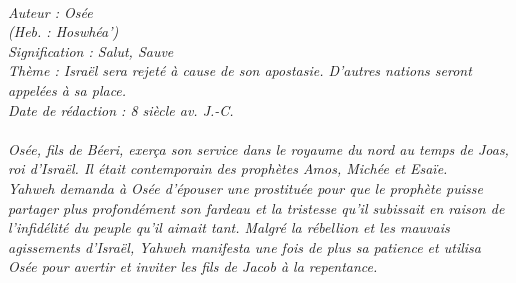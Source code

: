 \BFont
\noindent\hrulefill
{\footnotesize
\textit{
\bigskip
{\centering{}
\\Auteur : Osée
\\(Heb. : Hoswhéa')
\\Signification : Salut, Sauve
\\Thème : Israël sera rejeté à cause de son apostasie. D'autres nations seront appelées à sa place.
\\Date de rédaction : 8 siècle av. J.-C.\\}
}
\textit{
\\Osée, fils de Béeri, exerça son service dans le royaume du nord au temps de Joas, roi d'Israël. Il était contemporain des prophètes Amos, Michée et Esaïe.
\\Yahweh demanda à Osée d'épouser une prostituée pour que le prophète puisse partager plus profondément son fardeau et la tristesse qu'il subissait en raison de l'infidélité du peuple qu'il aimait tant. Malgré la rébellion et les mauvais agissements d'Israël, Yahweh manifesta une fois de plus sa patience et utilisa Osée pour avertir et inviter les fils de Jacob à la repentance.\bigskip
}
}
\par\nobreak\noindent\hrulefill
